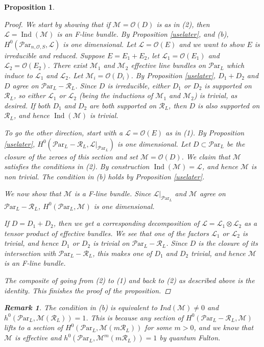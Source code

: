 \documentclass[11pt]{amsart}
\newcommand\op{\operatorname}
\newcommand\tensor{\otimes}
\newcommand\ml{\mathcal{L}}
\newcommand\ParL{\mathcal{P}\text{ar}_L}
\newcommand\Par{\mathcal{P}\text{ar} }
\newtheorem{remark}[theorem]{ Remark}
\newtheorem{proposition}[theorem]{Proposition}
\numberwithin{theorem}{subsection}
\begin{document}
{\begin{proposition}
\begin{proof}
We start by showing that if $\mathcal{M}=\mathcal{O}(D)$ is as in (2), then $\ml=\op{Ind}(\mathcal{M})$ is an F-line bundle.
By Proposition \ref{uselater}, and (b), $H^0(\Par_{n,\mathcal{O},S},\ml)$ is one dimensional. Let $\ml=
\mathcal{O}(E)$ and we want to show $E$ is irreducible and reduced. Suppose $E=E_1+E_2$, let $\ml_1=\mathcal{O}(E_1)$ and $\ml_2=\mathcal{O}(E_2)$. There exist $\mathcal{M}_1$ and $\mathcal{M}_2$ effective line bundles on $\Par_L$ which induce to $\ml_1$ and $\ml_2$. Let $\mathcal{M}_i=\mathcal{O}(D_i)$. By Proposition \ref{uselater}, $D_1+D_2$ and $D$ agree on $\Par_L-\mathcal{R}_L$. Since $D$ is irreducible, either $D_1$ or $D_2$ is supported on $\mathcal{R}_L$, so either $\ml_1$ or $\ml_2$ (being the inductions of $\mathcal{M}_1$ and $\mathcal{M}_2$) is trivial, as desired. If both $D_1$ and $D_2$ are both supported on  $\mathcal{R}_L$, then $D$ is also supported on $\mathcal{R}_L$, and hence $\op{Ind}(\mathcal{M})$ is trivial.

To go the other direction, start with a $\ml=\mathcal{O}(E)$ as in (1). By Proposition \ref{uselater}, $H^0(\Par_L-\mathcal{R}_L,\mathcal{L}|_{\ParL})$ is  one dimensional. Let ${D}\subset \ParL$ be the closure of the zeroes of this section and set $\mathcal{M}=\mathcal{O}(D)$.  We claim that $\mathcal{M}$ satisfies the conditions in (2). By construction $\op{Ind}(\mathcal{M})=\ml$, and hence $\mathcal{M}$ is non trivial. The condition in (b) holds by Proposition \ref{uselater}.

We now show that $\mathcal{M}$ is a F-line bundle. Since
$\mathcal{L}|_{\ParL}$ and $\mathcal{M}$ agree on $\Par_L-\mathcal{R}_L$, $H^0(\Par_L,\mathcal{M})$ is one dimensional.


If $D=D_1+D_2$, then we get a corresponding decomposition of $\ml=\ml_1\tensor\ml_2$ as a tensor product of effective bundles. We see that one of the factors $\ml_1$ or $\ml_2$ is trivial, and hence $D_1$ or $D_2$ is trivial on $\Par_L-\mathcal{R}_L$. Since $D$ is the closure of its intersection with $\Par_L-\mathcal{R}_L$, this makes one of $D_1$ and  $D_2$ trivial, and hence $\mathcal{M}$ is an F-line bundle.

The composite of going from (2) to (1) and back to (2) as described above is the identity. This finishes the proof of the proposition.


\end{proof}
\begin{remark}\label{putR}
The condition in (b) is equivalent to $Ind(\mathcal{M})\neq 0$ and $h^0(\ParL,\mathcal{M}(\mathcal{R}_L))=1$. This is because any section of $H^0(\ParL-\mathcal{R}_L,\mathcal{M})$ lifts to a section of
$H^0(\ParL,\mathcal{M}(m\mathcal{R}_L))$ for some $m>0$, and we know that $\mathcal{M}$ is effective and $h^0(\ParL,\mathcal{M}^m(m\mathcal{R}_L))=1$ by quantum Fulton.


\end{remark}
\end{proposition}}
\end{document}
